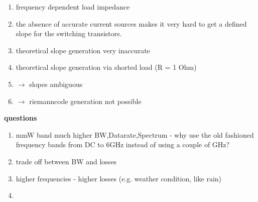 \begin{enumerate}
	\item frequency dependent load impedance
	\item the absence of accurate current sources makes it very hard to get a defined slope for the switching transistors.
	\item theoretical slope generation very inaccurate
	\item theoretical slope generation via shorted load  (R = 1 Ohm)
	\item $\rightarrow$ slopes ambiguous
	
	\item $\rightarrow$ riemanncode generation not possible                                                                                                                                                                                                                                                                                                                                                                                                                                                                                                                                                                                                                                                                                                                                                                                                                                                                                                                                                                                                                                                                                                                                                                                                                                                                                                                                                                                                                                                          
\end{enumerate}
\vspace{1cm}
\textbf{questions}
\begin{enumerate}
	\item mmW band much higher BW,Datarate,Spectrum - why use the old fashioned frequency bands from DC to 6GHz instead of using a couple of GHz?
	\item trade off between BW and losses
	\item higher frequencies - higher losses (e.g. weather condition, like rain)
	\item 
\end{enumerate}